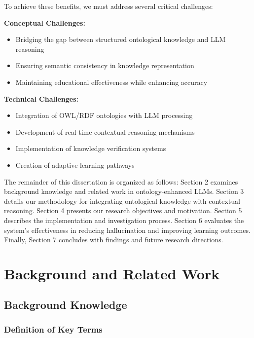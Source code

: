 \documentclass[a4paper,11pt,oneside]{article}
\begin{document}
  To achieve these benefits, we must address several critical challenges:

  \textbf{Conceptual Challenges:}
  \begin{itemize}
      \item Bridging the gap between structured ontological knowledge and LLM reasoning
      \item Ensuring semantic consistency in knowledge representation
      \item Maintaining educational effectiveness while enhancing accuracy
  \end{itemize}

  \textbf{Technical Challenges:}
  \begin{itemize}
      \item Integration of OWL/RDF ontologies with LLM processing
      \item Development of real-time contextual reasoning mechanisms
      \item Implementation of knowledge verification systems
      \item Creation of adaptive learning pathways
  \end{itemize}

  The remainder of this dissertation is organized as follows: Section 2 examines background knowledge and related work in 
  ontology-enhanced LLMs. Section 3 details our methodology for integrating ontological knowledge with contextual reasoning. 
  Section 4 presents our research objectives and motivation. Section 5 describes the implementation and investigation process. 
  Section 6 evaluates the system's effectiveness in reducing hallucination and improving learning outcomes. Finally, 
  Section 7 concludes with findings and future research directions.

  \section{Background and Related Work}

  \subsection{Background Knowledge}

  \subsubsection{Definition of Key Terms}
\end{document}
